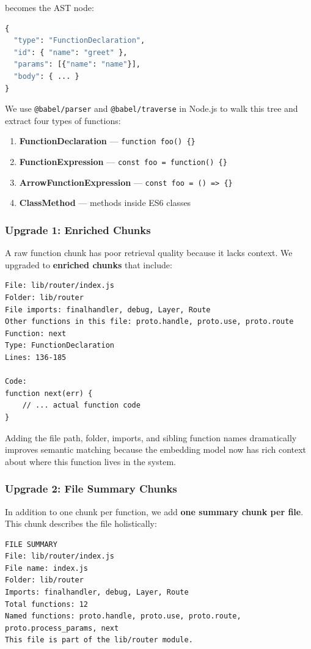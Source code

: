 \documentclass[a4paper,11pt]{article}
\begin{document}
\noindent becomes the AST node:
\begin{lstlisting}[language=Python]
{
  "type": "FunctionDeclaration",
  "id": { "name": "greet" },
  "params": [{"name": "name"}],
  "body": { ... }
}
\end{lstlisting}

We use \texttt{@babel/parser} and \texttt{@babel/traverse} in Node.js to walk this tree and extract four types of functions:
\begin{enumerate}
    \item \textbf{FunctionDeclaration} --- \texttt{function foo() \{\}}
    \item \textbf{FunctionExpression} --- \texttt{const foo = function() \{\}}
    \item \textbf{ArrowFunctionExpression} --- \texttt{const foo = () => \{\}}
    \item \textbf{ClassMethod} --- methods inside ES6 classes
\end{enumerate}

\subsubsection{Upgrade 1: Enriched Chunks}
A raw function chunk has poor retrieval quality because it lacks context. We upgraded to \textbf{enriched chunks} that include:

\begin{lstlisting}
File: lib/router/index.js
Folder: lib/router
File imports: finalhandler, debug, Layer, Route
Other functions in this file: proto.handle, proto.use, proto.route
Function: next
Type: FunctionDeclaration
Lines: 136-185

Code:
function next(err) {
    // ... actual function code
}
\end{lstlisting}

Adding the file path, folder, imports, and sibling function names dramatically improves semantic matching because the embedding model now has rich context about where this function lives in the system.

\subsubsection{Upgrade 2: File Summary Chunks}
In addition to one chunk per function, we add \textbf{one summary chunk per file}. This chunk describes the file holistically:

\begin{lstlisting}
FILE SUMMARY
File: lib/router/index.js
File name: index.js
Folder: lib/router
Imports: finalhandler, debug, Layer, Route
Total functions: 12
Named functions: proto.handle, proto.use, proto.route, proto.process_params, next
This file is part of the lib/router module.
\end{lstlisting}
\end{document}

